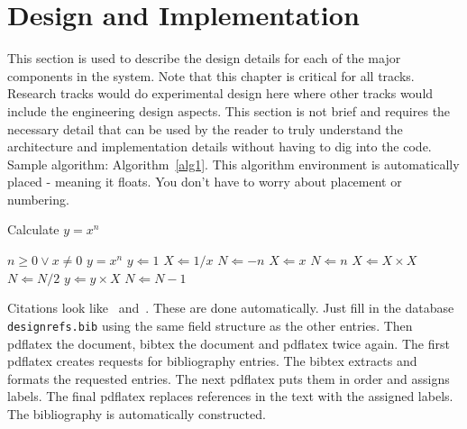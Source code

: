 

\chapter{Design  and Implementation}
This section is used to describe the design details for each of the major components 
in the system.    Note that this chapter is critical for all tracks.  Research tracks would do experimental design here where other tracks would include the engineering design aspects.    This section is not brief and requires the necessary detail that 
can be used by the reader to truly understand the architecture and implementation 
details without having to dig into the code.    Sample algorithm:  Algorithm~\ref{alg1}.  This algorithm environment is automatically placed - meaning it floats.   You don't have to worry about placement or numbering.  

\begin{algorithm} [tbh]                     %
\caption{Calculate $y = x^n$}          %
\label{alg1}                           %
\begin{algorithmic}                    %
    \REQUIRE $n \geq 0 \vee x \neq 0$
    \ENSURE $y = x^n$
    \STATE $y \Leftarrow 1$
        \STATE $X \Leftarrow 1 / x$
        \STATE $N \Leftarrow -n$
    \ELSE
        \STATE $X \Leftarrow x$
        \STATE $N \Leftarrow n$
    \ENDIF
            \STATE $X \Leftarrow X \times X$
            \STATE $N \Leftarrow N / 2$
        \ELSE[$N$ is odd]
            \STATE $y \Leftarrow y \times X$
            \STATE $N \Leftarrow N - 1$
        \ENDIF
    \ENDWHILE
\end{algorithmic}
\end{algorithm}
Citations look like~\cite{Choset:2005:PRM, arkin2009governing, lavalle2006}  and~\cite{wiki:asimo,lumelsky:1987, nolfi2000evolutionary}.  These are done automatically.  Just fill in the database {\tt designrefs.bib} using the same field structure as the other entries.  Then pdflatex the document, bibtex the document and pdflatex twice again.  The first pdflatex creates requests for bibliography entries.
The bibtex extracts and formats the requested entries.  The next pdflatex puts them in order and assigns labels.  The final pdflatex replaces references in the text with the assigned labels.
The bibliography is automatically constructed.  
 
